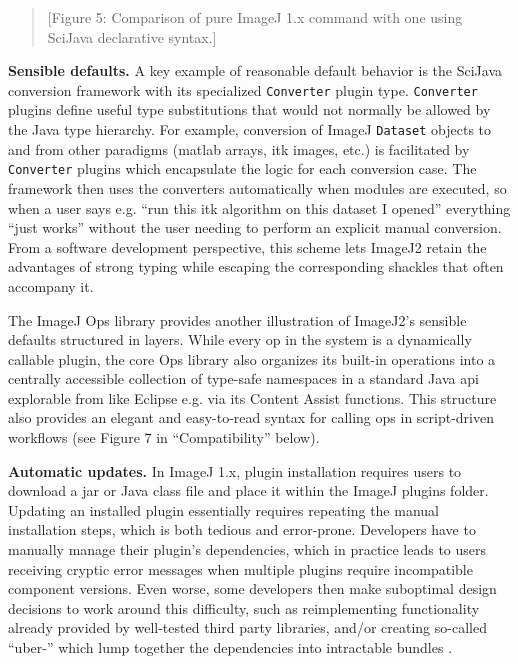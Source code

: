 \documentclass{bmcart}
\begin{document}
\begin{quote}
[Figure 5: Comparison of pure ImageJ 1.x command with one using SciJava
declarative syntax.]
\end{quote}

\textbf{Sensible defaults.} A key example of reasonable default behavior is the
SciJava conversion framework with its specialized \texttt{Converter} plugin
type. \texttt{Converter} plugins define useful type substitutions that would
not normally be allowed by the Java type hierarchy. For example, conversion of
ImageJ \texttt{Dataset} objects to and from other paradigms (\acrshort{matlab}
arrays, \acrshort{itk} images, etc.) is facilitated by \texttt{Converter}
plugins which encapsulate the logic for each conversion case. The framework
then uses the converters automatically when modules are executed, so when a
user says e.g. ``run this \acrshort{itk} algorithm on this dataset I opened''
everything ``just works'' without the user needing to perform an explicit
manual conversion. From a software development perspective, this scheme lets
ImageJ2 retain the advantages of strong typing while escaping the corresponding
shackles that often accompany it.

The ImageJ Ops library provides another illustration of ImageJ2's sensible
defaults structured in layers. While every op in the system is a dynamically
callable plugin, the core Ops library also organizes its built-in operations
into a centrally accessible collection of type-safe namespaces in a standard
Java \acrshort{api} explorable from  like Eclipse e.g. via its
Content Assist functions. This structure also provides an elegant and
easy-to-read syntax for calling ops in script-driven workflows (see Figure 7 in
``Compatibility'' below).

\textbf{Automatic updates.} In ImageJ 1.x, plugin installation requires users
to download a \acrfull{jar} or Java class file and place it within the ImageJ
plugins folder. Updating an installed plugin essentially requires repeating the
manual installation steps, which is both tedious and error-prone. Developers
have to manually manage their plugin's dependencies, which in practice leads to
users receiving cryptic error messages when multiple plugins require
incompatible component versions. Even worse, some developers then make
suboptimal design decisions to work around this difficulty, such as
reimplementing functionality already provided by well-tested third party
libraries, and/or creating so-called ``uber-'' which lump
together the dependencies into intractable bundles \cite{imagej_uber_jar}.
\end{document}
